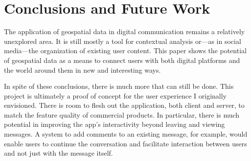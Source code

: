 \section{Conclusions and Future Work}

The application of geospatial data in digital communication remains a relatively unexplored area. It is still mostly a tool for contextual analysis or—as in social media—the organization of existing user content. This paper shows the potential of geospatial data as a means to connect users with both digital platforms and the world around them in new and interesting ways.

In spite of these conclusions, there is much more that can still be done. This project is ultimately a proof of concept for the user experience I originally envisioned. There is room to flesh out the application, both client and server, to match the feature quality of commercial products. In particular, there is much potential in improving the app's interactivity beyond leaving and viewing messages. A system to add comments to an existing message, for example, would enable users to continue the conversation and facilitate interaction between users and not just with the message itself.
